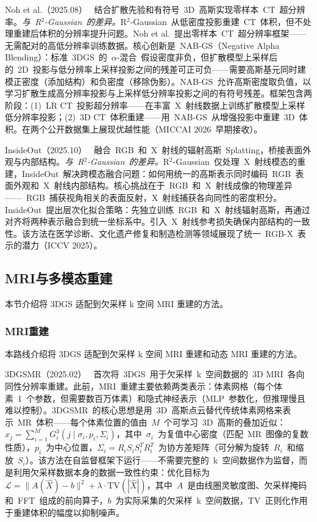 Noh et al.（2025.08）~\cite{2508_15151} 结合扩散先验和有符号~3D~高斯实现零样本~CT~超分辨率。\textit{与~R$^{2}$-Gaussian~的差异。}R$^{2}$-Gaussian~从低密度投影重建~CT~体积，但不处理重建后体积的分辨率提升问题。Noh et al.~提出零样本~CT~超分辨率框架——无需配对的高低分辨率训练数据。核心创新是~NAB-GS（Negative Alpha Blending）：标准~3DGS~的~$\alpha$-混合~假设密度非负，但扩散模型上采样后的~2D~投影与低分辨率上采样投影之间的残差可正可负——需要高斯基元同时建模正密度（添加结构）和负密度（移除伪影）。NAB-GS~允许高斯密度取负值，以学习扩散生成高分辨率投影与上采样低分辨率投影之间的有符号残差。框架包含两阶段：(1)~LR CT~投影超分辨率——在丰富~X~射线数据上训练扩散模型上采样低分辨率投影；(2)~3D CT~体积重建——用~NAB-GS~从增强投影中重建~3D~体积。在两个公开数据集上展现优越性能（MICCAI 2026~早期接收）。

InsideOut（2025.10）~\cite{2510_17864} 融合~RGB~和~X~射线的辐射高斯~Splatting，桥接表面外观与内部结构。\textit{与~R$^{2}$-Gaussian~的差异。}R$^{2}$-Gaussian~仅处理~X~射线模态的重建，InsideOut~解决跨模态融合问题：如何用统一的高斯表示同时编码~RGB~表面外观和~X~射线内部结构。核心挑战在于~RGB~和~X~射线成像的物理差异——~RGB~捕获视角相关的表面反射，X~射线捕获各向同性的密度积分。InsideOut~提出层次化拟合策略：先独立训练~RGB~和~X~射线辐射高斯，再通过对齐将两种表示融合到统一坐标系中。引入~X~射线参考损失确保内部结构的一致性。该方法在医学诊断、文化遗产修复和制造检测等领域展现了统一~RGB-X~表示的潜力（ICCV 2025）。

\subsection{MRI与多模态重建}
\label{ss:19_5}

本节介绍将 3DGS 适配到欠采样 k 空间 MRI 重建的方法。

\subsubsection{MRI重建}

本路线介绍将 3DGS 适配到欠采样 k 空间 MRI 重建和动态 MRI 重建的方法。

3DGSMR（2025.02）~\cite{2502_06510} 首次将~3DGS~用于欠采样~k~空间数据的~3D MRI~各向同性分辨率重建。此前，MRI~重建主要依赖两类表示：体素网格（每个体素~1~个参数，但需要数百万体素）和隐式神经表示（MLP~参数化，但推理慢且难以控制）。3DGSMR~的核心思想是用~3D~高斯点云替代传统体素网格来表示~MR~体积——每个体素位置的值由~$M$~个可学习~3D~高斯的叠加近似：$x_j = \sum_{i=1}^{M} G_i^3(j \mid \sigma_i, p_i, \Sigma_i)$，其中~$\sigma_i$~为复值中心密度（匹配~MR~图像的复数性质），$p_i$~为中心位置，$\Sigma_i = R_i S_i S_i^T R_i^T$~为协方差矩阵（可分解为旋转~$R_i$~和缩放~$S_i$）。该方法在自监督框架下运行——不需要完整的~k~空间数据作为监督，而是利用欠采样数据本身的数据一致性约束：优化目标为~$\mathcal{L} = \|A(\hat{X}) - b\|^2 + \lambda \cdot \text{TV}(|\hat{X}|)$，其中~$A$~是由线圈灵敏度图、欠采样掩码和~FFT~组成的前向算子，$b$~为实际采集的欠采样~k~空间数据，TV~正则化作用于重建体积的幅度以抑制噪声。

